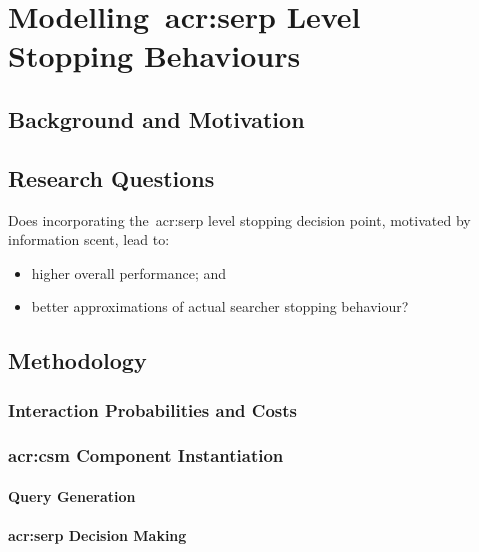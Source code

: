 
\chapter[Modelling~\gls{acr:serp} Level Stopping Behaviours]{Modelling~\gls{acr:serp} Level\\Stopping Behaviours}\label{chap:serp}

\section{Background and Motivation}

\section{Research Questions}

Does incorporating the~\gls{acr:serp} level stopping decision point, motivated by information scent, lead to:

\begin{itemize}
    
    \item[]{ higher overall performance; and}
    \item[]{ better approximations of actual searcher stopping behaviour?}
    
\end{itemize}

\section{Methodology}

\subsection{Interaction Probabilities and Costs}

\subsection{\gls{acr:csm} Component Instantiation}

\subsubsection{Query Generation}

\subsubsection{\gls{acr:serp} Decision Making}

